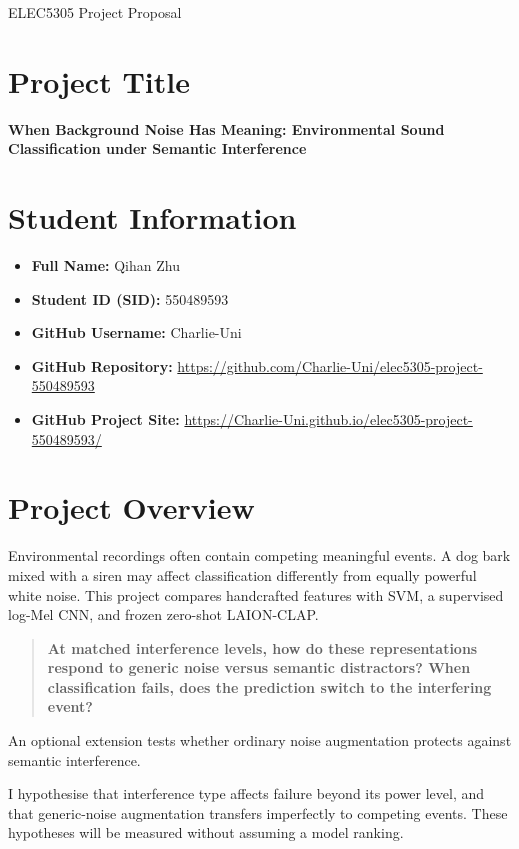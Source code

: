 \documentclass[a4paper,11pt]{article}
\newcommand{\studenturl}[1]{{\fontsize{10.5}{13.6}\selectfont\url{#1}}}
\begin{document}
\begin{center}
{\LARGE ELEC5305 Project Proposal}
\end{center}

\section{Project Title}

\textbf{When Background Noise Has Meaning: Environmental Sound Classification under Semantic Interference}

\section{Student Information}

\begin{itemize}
\item \textbf{Full Name:} Qihan Zhu
\item \textbf{Student ID (SID):} 550489593
\item \textbf{GitHub Username:} Charlie-Uni
\item \textbf{GitHub Repository:} \studenturl{https://github.com/Charlie-Uni/elec5305-project-550489593}
\item \textbf{GitHub Project Site:} \studenturl{https://Charlie-Uni.github.io/elec5305-project-550489593/}
\end{itemize}

\section{Project Overview}

Environmental recordings often contain competing meaningful events. A dog bark mixed with a siren may affect classification differently from equally powerful white noise. This project compares handcrafted features with SVM, a supervised log-Mel CNN, and frozen zero-shot LAION-CLAP.

\begin{quote}
\textbf{At matched interference levels, how do these representations respond to generic noise versus semantic distractors? When classification fails, does the prediction switch to the interfering event?}
\end{quote}

An optional extension tests whether ordinary noise augmentation protects against semantic interference.

I hypothesise that interference type affects failure beyond its power level, and that generic-noise augmentation transfers imperfectly to competing events. These hypotheses will be measured without assuming a model ranking.
\end{document}
